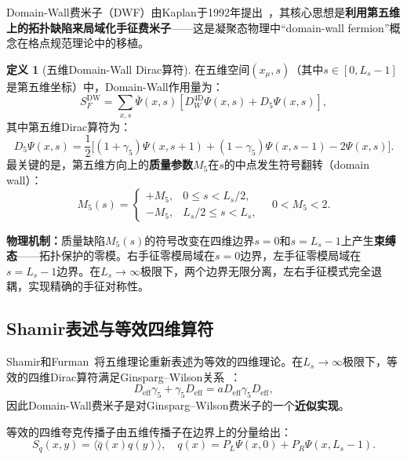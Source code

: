 \documentclass[12pt,a4paper]{ctexart}
\theoremstyle{definition}
\newtheorem{definition}{定义}[section]
\begin{document}
Domain-Wall费米子（DWF）由Kaplan于1992年提出~\cite{Kaplan1992}，其核心思想是\textbf{利用第五维上的拓扑缺陷来局域化手征费米子}——这是凝聚态物理中``domain-wall fermion''概念在格点规范理论中的移植。

\begin{definition}[五维Domain-Wall Dirac算符]
在五维空间$(x_\mu, s)$（其中$s\in[0, L_s-1]$是第五维坐标）中，Domain-Wall作用量为：
\begin{equation}
S_F^{\text{DW}} = \sum_{x,s} \bar\Psi(x,s) \left[ D_W^{\text{4D}}\Psi(x,s) + D_5\Psi(x,s) \right],
\label{eq:dwf_action}
\end{equation}
其中第五维Dirac算符为：
\begin{equation}
D_5\Psi(x,s) = \frac{1}{2}\big[(1+\gamma_5)\Psi(x,s+1) + (1-\gamma_5)\Psi(x,s-1) - 2\Psi(x,s)\big].
\label{eq:D5}
\end{equation}
最关键的是，第五维方向上的\textbf{质量参数}$M_5$在$s$的中点发生符号翻转（domain wall）：
\begin{equation}
M_5(s) = \begin{cases}
+M_5, & 0 \le s < L_s/2,\\
-M_5, & L_s/2 \le s < L_s,
\end{cases}
\quad 0 < M_5 < 2.
\label{eq:domain_wall_mass}
\end{equation}
\end{definition}

\textbf{物理机制：}质量缺陷$M_5(s)$的符号改变在四维边界$s=0$和$s=L_s-1$上产生\textbf{束缚态}——拓扑保护的零模。右手征零模局域在$s=0$边界，左手征零模局域在$s=L_s-1$边界。在$L_s\to\infty$极限下，两个边界无限分离，左右手征模式完全退耦，实现精确的手征对称性。

\subsection{Shamir表述与等效四维算符}

Shamir和Furman~\cite{FurmanShamir1995}将五维理论重新表述为等效的四维理论。在$L_s\to\infty$极限下，等效的四维Dirac算符满足Ginsparg--Wilson关系~\cite{GinspargWilson1982}：
\begin{equation}
D_{\text{eff}}\gamma_5 + \gamma_5 D_{\text{eff}} = a D_{\text{eff}}\gamma_5 D_{\text{eff}},
\label{eq:GW_relation}
\end{equation}
因此Domain-Wall费米子是对Ginsparg--Wilson费米子的一个\textbf{近似实现}。

等效的四维夸克传播子由五维传播子在边界上的分量给出：
\begin{equation}
S_q(x,y) = \langle \bar q(x) q(y) \rangle, \quad q(x) = P_L\Psi(x,0) + P_R\Psi(x,L_s-1).
\label{eq:physical_quark}
\end{equation}
\end{document}
